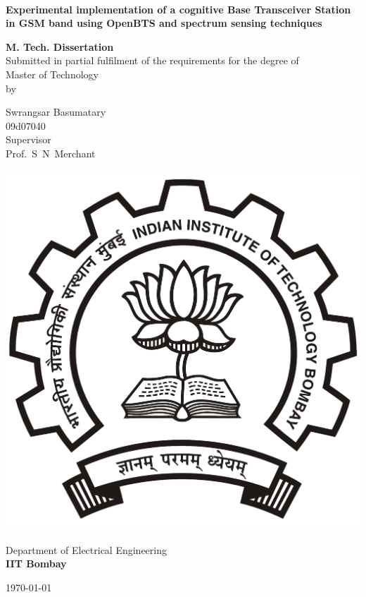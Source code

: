 \begin{titlepage}
\begin{center}
\begin{spacing}{1.0}


~\\[0.3cm]
{ \LARGE \bfseries  Experimental implementation of a cognitive Base Transceiver Station in GSM band using OpenBTS and spectrum sensing techniques\\[1.2cm] }

\textbf{\large M. Tech. Dissertation}\\[1.2cm]

{Submitted in partial fulfilment of the requirements for the degree of\\[0.1cm]
Master of Technology\\[0.3cm]
by\\[0.3cm]}

{\LARGE Swrangsar Basumatary \\[0.1cm]}
{09d07040 \\[1.1cm]}
{Supervisor \\[0.1cm]}
{\LARGE Prof.~S~N~Merchant \\[1.3cm]}

\includegraphics[width=0.21\textheight]{iitbLogo}~\\[0.9cm]
Department of Electrical Engineering\\[0.2cm]
\textbf{\large IIT Bombay}\\[1.3cm]


\vfill

{\large \today}

\end{spacing}
\end{center}
\end{titlepage}
